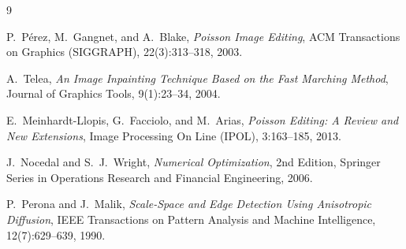 \documentclass{amsart}
\begin{document}
\begin{thebibliography}{9}

P.~P\'erez, M.~Gangnet, and A.~Blake,
\emph{Poisson Image Editing},
ACM Transactions on Graphics (SIGGRAPH), 22(3):313--318, 2003.

A.~Telea,
\emph{An Image Inpainting Technique Based on the Fast Marching Method},
Journal of Graphics Tools, 9(1):23--34, 2004.

E.~Meinhardt-Llopis, G.~Facciolo, and M.~Arias,
\emph{Poisson Editing: A Review and New Extensions},
Image Processing On Line (IPOL), 3:163--185, 2013.

J.~Nocedal and S.~J.~Wright,
\emph{Numerical Optimization},
2nd Edition, Springer Series in Operations Research and Financial Engineering, 2006.

P.~Perona and J.~Malik,
\emph{Scale-Space and Edge Detection Using Anisotropic Diffusion},
IEEE Transactions on Pattern Analysis and Machine Intelligence, 12(7):629--639, 1990.

\end{thebibliography}
\end{document}
